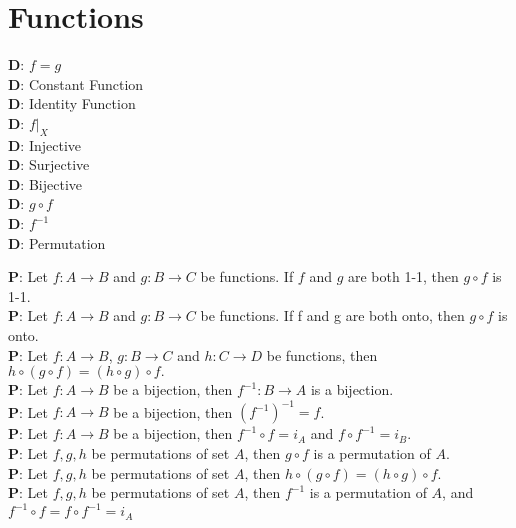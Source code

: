 \documentclass[a4paper]{article}
\begin{document}
\section*{Functions}
\begin{multicols}{3}
	\noindent
	\textbf{D}: $f=g$\\
	\textbf{D}: Constant Function\\
	\textbf{D}: Identity Function\\
	\textbf{D}: $f\vert_X$\\
	\textbf{D}: Injective\\
	\textbf{D}: Surjective\\
	\textbf{D}: Bijective\\
	\textbf{D}: $g \circ f$\\
	\textbf{D}: $f^{-1}$\\
	\textbf{D}: Permutation
\end{multicols}
	\noindent
	\textbf{P}: Let $f : A \rightarrow B$ and $g : B \rightarrow C$ be functions. If $f$ and $g$ are both 1-1, then $g\circ f$ is 1-1.\\
	\textbf{P}: Let $f : A \rightarrow B$ and $g : B \rightarrow C$ be functions. If f and g are both onto, then $g\circ f$  is onto.\\
	\textbf{P}: Let $f : A \rightarrow B$, $g : B \rightarrow C$ and $h : C \rightarrow D$ be functions, then $h\circ (g\circ f) = (h\circ g)\circ f.$\\
	\textbf{P}: Let $f : A \rightarrow B$ be a bijection, then $f^{-1}: B \rightarrow A$ is a bijection.\\
	\textbf{P}: Let $f : A \rightarrow B$ be a bijection, then $(f^{-1})^{-1} = f$.\\
	\textbf{P}: Let $f : A \rightarrow B$ be a bijection, then $f^{-1} \circ f = i_A$ and $f \circ f^{-1} = i_B$.\\
	\textbf{P}: Let $f, g, h$ be permutations of set $A$, then $g \circ f$ is a permutation of $A$.\\
	\textbf{P}: Let $f, g, h$ be permutations of set $A$, then $h\circ (g\circ f) = (h\circ g)\circ f.$\\
	\textbf{P}: Let $f, g, h$ be permutations of set $A$, then $f^{-1}$ is a permutation of $A$, and $f^{-1} \circ f = f \circ f^{-1} = i_A$
	
\end{document}
